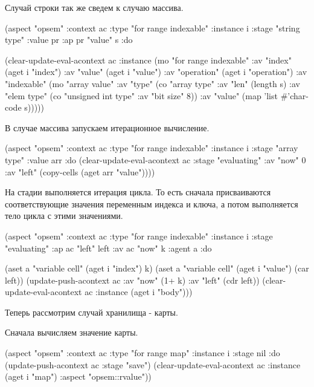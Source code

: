 \documentclass[12pt,twoside,russian]{article}
\newcommand{\textABMLString}[1]{{\color{abmlString}#1}}
\newcommand{\ABMLString}[1]{\abmlinline{\textABMLString{#1}}}
\begin{document}
Случай строки так же сведем к случаю массива.

\begin{ABMLCode}
(aspect "opsem" :context ac :type "for range indexable" :instance i 
  :stage "string type" :value pr :ap pr "value" s :do 
  
  (clear-update-eval-acontext ac :instance (mo "for range indexable" 
  :av "index" (aget i "index") 
  :av "value" (aget i "value") 
  :av "operation" (aget i "operation") 
  :av "indexable" (mo "array value" 
    :av "type" (co "array type" :av "len" (length s) 
      :av "elem type" (co "unsigned int type" :av "bit size" 8)) 
    :av "value" (map 'list #'char-code s)))))
\end{ABMLCode}

В случае массива запускаем итерационное вычисление.

\begin{ABMLCode}
(aspect "opsem" :context ac :type "for range indexable" :instance i 
  :stage "array type" :value arr :do 
  (clear-update-eval-acontext ac :stage "evaluating" :av "now" 0 
    :av "left" (copy-cells (aget arr "value"))))
\end{ABMLCode}

На стадии \ABMLString{evaluating} выполняется итерация цикла. То есть сначала присваиваются соответствующие значения переменным индекса и ключа, а потом выполняется тело цикла с этими значениями.

\begin{ABMLCode}
(aspect "opsem" :context ac :type "for range indexable" :instance i 
  :stage "evaluating" :ap ac "left" left :av ac "now" k :agent a :do 
  
  (aset a "variable cell" (aget i "index") k)
  (aset a "variable cell" (aget i "value") (car left))
  (update-push-acontext ac :av "now" (1+ k) :av "left" (cdr left))
  (clear-update-eval-acontext ac :instance (aget i "body")))
\end{ABMLCode}

Теперь рассмотрим случай хранилища - карты. 

Сначала вычисляем значение карты.

\begin{ABMLCode}
(aspect "opsem" :context ac :type "for range map" :instance i 
  :stage nil :do 
  (update-push-acontext ac :stage "save")
  (clear-update-eval-acontext ac :instance (aget i "map") 
                                 :aspect "opsem::rvalue"))
\end{ABMLCode}
\end{document}

